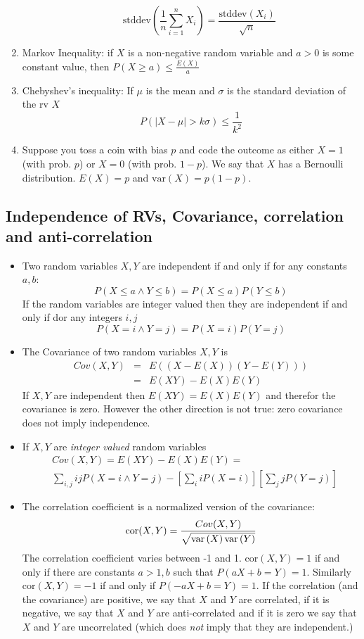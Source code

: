 \documentclass[10pt,twocolumn]{article}
\begin{document}
\begin{enumerate}
\begin{itemize}
\[
\mbox{stddev} \left( \frac{1}{n} \sum_{i=1}^n X_i \right) = \frac{\mbox{stddev}(X_i)}{\sqrt{n}}
\]
\end{itemize}
\item Markov Inequality: if $X$ is a non-negative random variable and
  $a>0$ is some constant value, then  $P(X\geq a)\leq \frac{E(X)}{a}$
\item Chebyshev's inequality: If $\mu$ is the mean and $\sigma$ is the
  standard deviation of the rv $X$
\[P(|X-\mu|>k\sigma) \leq \frac{1}{k^2} \]
\item Suppose you toss a coin with bias $p$ and code the outcome as
  either $X=1$ (with prob. $p$) or $X=0$ (with prob. $1-p$). We say
  that $X$ has a Bernoulli distribution. $E(X)=p$ and $\mbox{var}(X)=p(1-p)$.
\end{enumerate}

\subsection*{Independence of RVs, Covariance, correlation and anti-correlation}
\begin{itemize}
\item Two random variables $X,Y$ are independent if and only if for any constants
  $a,b$:
\[
P\left(X \leq a \wedge Y \leq b \right) = P(X\leq a)P(Y \leq b)
\]
If the random variables are integer valued then they are independent
if and only if dor any integers $i,j$
\[
P\left(X=i \wedge Y=j \right) = P(X=i)P(Y=j)
\]
\item The Covariance of two random variables $X,Y$ is
\begin{eqnarray*}
Cov(X,Y) &=& E\left( (X-E(X))(Y-E(Y))\right) \\
&=& E(XY)-E(X)E(Y)
\end{eqnarray*}
If $X,Y$ are independent then $E(XY)=E(X)E(Y)$ and therefor the
covariance is zero. However the other direction is not true: zero
covariance does not imply independence.
\item If $X,Y$ are {\em integer valued} random variables
\begin{eqnarray*}
&Cov(X,Y) = E(XY)-E(X)E(Y) = \\
&\sum_{i,j} ijP(X=i \wedge Y=j)
-[\sum_i i P(X=i)] [\sum_j j P(Y=j) ]
\end{eqnarray*}
\item The correlation coefficient is a normalized version of the
  covariance:
\[
\mbox{cor}(X,Y) = \frac{Cov(X,Y)}{\sqrt{\mbox{var}\left( X \right)\mbox{var}\left( Y \right)}}
\]
The correlation coefficient varies between -1 and 1.
$\mbox{cor}(X,Y)=1$ if and only if there are constants $a>1,b$ such
that $P(aX+b=Y)=1$. Similarly $\mbox{cor}(X,Y)=-1$ if and only if
$P(-aX+b=Y)=1$.  If the correlation (and the covariance) are positive,
we say that $X$ and $Y$ are correlated, if it is negative, we say that
$X$ and $Y$ are anti-correlated and if it is zero we say that $X$ and
$Y$ are uncorrelated (which does {\em not} imply that they are
independent.)
\end{itemize}
\end{document}

